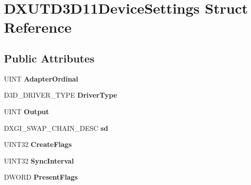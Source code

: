 \hypertarget{struct_d_x_u_t_d3_d11_device_settings}{\section{D\+X\+U\+T\+D3\+D11\+Device\+Settings Struct Reference}
\label{struct_d_x_u_t_d3_d11_device_settings}
}
\subsection*{Public Attributes}
\begin{DoxyCompactItemize}
\item 
\hypertarget{struct_d_x_u_t_d3_d11_device_settings_a596e7342b4a3c6fe575e247c559125ac}{U\+I\+N\+T {\bfseries Adapter\+Ordinal}}\label{struct_d_x_u_t_d3_d11_device_settings_a596e7342b4a3c6fe575e247c559125ac}

\item 
\hypertarget{struct_d_x_u_t_d3_d11_device_settings_a6494a8c584fb4192e29891faaa871b92}{D3\+D\+\_\+\+D\+R\+I\+V\+E\+R\+\_\+\+T\+Y\+P\+E {\bfseries Driver\+Type}}\label{struct_d_x_u_t_d3_d11_device_settings_a6494a8c584fb4192e29891faaa871b92}

\item 
\hypertarget{struct_d_x_u_t_d3_d11_device_settings_ada60f0d77a5ba919df6221558c1b15da}{U\+I\+N\+T {\bfseries Output}}\label{struct_d_x_u_t_d3_d11_device_settings_ada60f0d77a5ba919df6221558c1b15da}

\item 
\hypertarget{struct_d_x_u_t_d3_d11_device_settings_a13062c0973362742750914b71192c5c2}{D\+X\+G\+I\+\_\+\+S\+W\+A\+P\+\_\+\+C\+H\+A\+I\+N\+\_\+\+D\+E\+S\+C {\bfseries sd}}\label{struct_d_x_u_t_d3_d11_device_settings_a13062c0973362742750914b71192c5c2}

\item 
\hypertarget{struct_d_x_u_t_d3_d11_device_settings_a29668e73953a57c011e2ed829967bcba}{U\+I\+N\+T32 {\bfseries Create\+Flags}}\label{struct_d_x_u_t_d3_d11_device_settings_a29668e73953a57c011e2ed829967bcba}

\item 
\hypertarget{struct_d_x_u_t_d3_d11_device_settings_ae434f01c52b52a7be7d2232d93d2f6da}{U\+I\+N\+T32 {\bfseries Sync\+Interval}}\label{struct_d_x_u_t_d3_d11_device_settings_ae434f01c52b52a7be7d2232d93d2f6da}

\item 
\hypertarget{struct_d_x_u_t_d3_d11_device_settings_a1fd82480f604c24c9b18393f39ca7c85}{D\+W\+O\+R\+D {\bfseries Present\+Flags}}\label{struct_d_x_u_t_d3_d11_device_settings_a1fd82480f604c24c9b18393f39ca7c85}


\end{DoxyCompactItemize}
